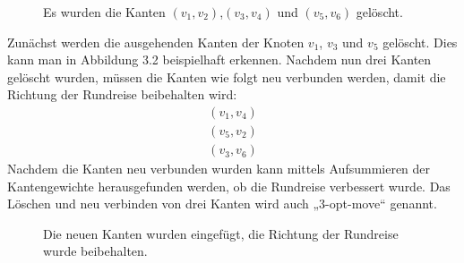\begin{figure}[bh]
\centering
{}
\caption[Löschen von drei Kanten in 3-opt]{Es wurden die Kanten
$(v_1,v_2)$,$(v_3,v_4)$ und $(v_5,v_6)$ gelöscht.}
\end{figure}
Zunächst werden die ausgehenden Kanten der Knoten $v_1$, 
$v_3$ und $v_5$ gelöscht. Dies kann man in Abbildung 3.2 beispielhaft
erkennen. Nachdem nun drei Kanten gelöscht wurden, müssen die Kanten wie
folgt neu verbunden werden, damit die Richtung der Rundreise beibehalten
wird\cite{nagata}: 
\begin{align*}
  (v_1, v_4)\\
  (v_5, v_2)\\
  (v_3, v_6)
\end{align*}
Nachdem die Kanten neu verbunden wurden kann mittels
Aufsummieren der Kantengewichte herausgefunden werden, ob die Rundreise
verbessert wurde. Das Löschen und neu verbinden von drei Kanten wird
auch „3-opt-move“ genannt.


\begin{figure}[bh]
\centering
{}
\caption[Neues Verbinden der Kanten in 3-opt]{Die neuen Kanten wurden
eingefügt, die Richtung der Rundreise wurde beibehalten.}
\end{figure}

